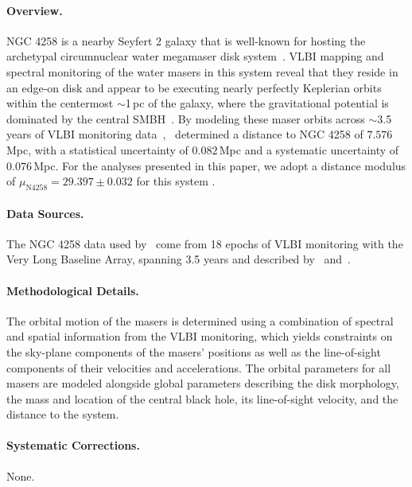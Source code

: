 \paragraph{Overview.}
NGC 4258 is a nearby Seyfert 2 galaxy that is well-known for hosting the archetypal circumnuclear water megamaser disk system~\citep{1988IAUS..129..231C,1995ApJ...440..619G}.  VLBI mapping and spectral monitoring of the water masers in this system reveal that they reside in an edge-on disk and appear to be executing nearly perfectly Keplerian orbits within the centermost $\sim$1\,pc of the galaxy, where the gravitational potential is dominated by the central SMBH~\citep{1995Natur.373..127M,1999Natur.400..539H}.  By modeling these maser orbits across $\sim$3.5 years of VLBI monitoring data~\citep[collected by][]{2007ApJ...659.1040A,2008ApJ...672..800H,2013ApJ...775...13H},~\citet{2019ApJ...886L..27R} determined a distance to NGC 4258 of $7.576$\,Mpc, with a statistical uncertainty of $0.082$\,Mpc and a systematic uncertainty of $0.076$\,Mpc.  For the analyses presented in this paper, we adopt a distance modulus of $\mu_{\text{N4258}} = 29.397 \pm 0.032$ for this system \citep{2019ApJ...886L..27R}.

\paragraph{Data Sources.}
The NGC 4258 data used by~\citet{2019ApJ...886L..27R} come from 18 epochs of VLBI monitoring with the Very Long Baseline Array, spanning 3.5 years and described by~\citet{2008ApJ...672..800H} and~\citet{2013ApJ...775...13H}.

\paragraph{Methodological Details.}
The orbital motion of the masers is determined using a combination of spectral and spatial information from the VLBI monitoring, which yields constraints on the sky-plane components of the masers' positions as well as the line-of-sight components of their velocities and accelerations.  The orbital parameters for all masers are modeled alongside global parameters describing the disk morphology, the mass and location of the central black hole, its line-of-sight velocity, and the distance to the system.

\paragraph{Systematic Corrections.}
None.

